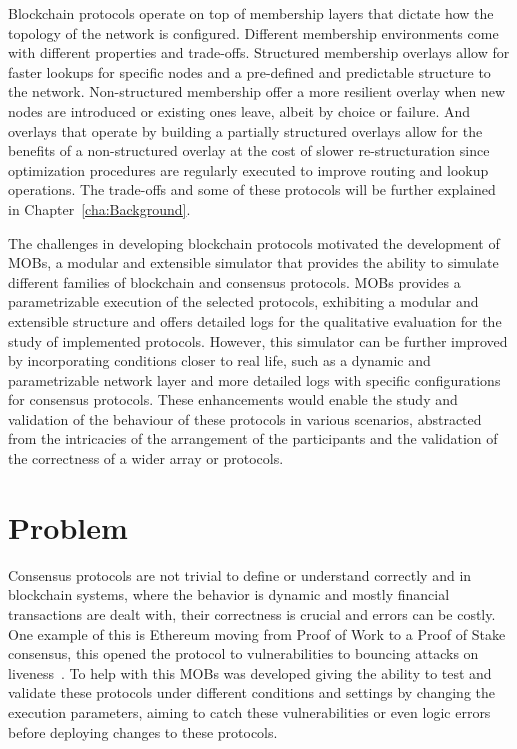 Blockchain protocols operate on top of membership layers that dictate how the topology of the network is configured.
Different membership environments come with different properties and trade-offs. Structured membership overlays allow for faster lookups for
specific nodes and a pre-defined and predictable structure to the network. Non-structured membership offer a more resilient overlay when
new nodes are introduced or existing ones leave, albeit by choice or failure. And overlays that operate by building a partially structured
overlays allow for the benefits of a non-structured overlay at the cost of slower re-structuration since optimization
procedures are regularly executed to improve routing and lookup operations. The trade-offs and some of these protocols will be further
explained in Chapter~\ref{cha:Background}.

The challenges in developing blockchain protocols motivated the development of MOBs, a modular and extensible simulator that provides
the ability to simulate different families of blockchain and consensus protocols.
MOBs provides a parametrizable execution of the selected protocols, exhibiting a modular and extensible structure and offers detailed logs for the
qualitative evaluation for the study of implemented protocols. However, this simulator can be further improved by incorporating conditions closer
to real life, such as a dynamic and parametrizable network layer and more detailed logs with specific configurations for consensus protocols.
These enhancements would enable the study and validation of the behaviour of these protocols in various scenarios, abstracted from the intricacies
of the arrangement of the participants and the validation of the correctness of a wider array or protocols.

\section{Problem}\label{sub:problem}
Consensus protocols are not trivial to define or understand correctly and in blockchain systems, where the behavior is dynamic and mostly 
financial transactions are dealt with, their correctness is crucial and errors can be costly. One example of this is Ethereum moving from 
Proof of Work to a Proof of Stake consensus, this opened the protocol to vulnerabilities to bouncing attacks on liveness~\cite{ethereum_analysis}. 
To help with this MOBs was developed giving the ability to test and validate these protocols under different conditions and settings by 
changing the execution parameters, aiming to catch these vulnerabilities or even logic errors before deploying changes to these protocols.

